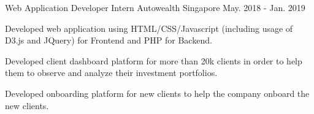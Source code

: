 \begin{cventries}

  \cventry
    {Web Application Developer Intern} %
    {Autowealth} %
    {Singapore} %
    {May. 2018 - Jan. 2019} %
    {
      \begin{cvitems} %
        \item {Developed web application using HTML/CSS/Javascript (including usage of D3.js and JQuery) for Frontend and PHP for Backend.}
        \item {Developed client dashboard platform for more than 20k clients in order to help them to observe and analyze their investment portfolios.}
        \item {Developed onboarding platform for new clients to help the company onboard the new clients.}
      \end{cvitems}
    }

\end{cventries}
